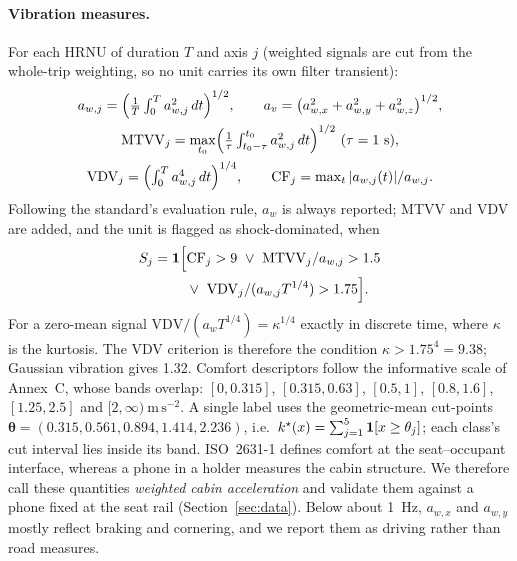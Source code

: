 \paragraph{Vibration measures.}
For each HRNU of duration $T$ and axis $j$ (weighted signals are cut from the whole-trip weighting, so no unit carries its own filter transient):
\begin{gather}
a_{w,j}=\Bigl(\tfrac1T\textstyle\int_0^Ta_{w,j}^2\,dt\Bigr)^{1/2},\qquad
a_v=\bigl(a_{w,x}^2+a_{w,y}^2+a_{w,z}^2\bigr)^{1/2},\\
\mathrm{MTVV}_j=\max_{t_0}\Bigl(\tfrac1\tau\textstyle\int_{t_0-\tau}^{t_0}a_{w,j}^2\,dt\Bigr)^{1/2}\ (\tau=1~\mathrm{s}),\\
\mathrm{VDV}_j=\Bigl(\textstyle\int_0^Ta_{w,j}^4\,dt\Bigr)^{1/4},\qquad
\mathrm{CF}_j=\max_t|a_{w,j}(t)|/a_{w,j}.
\end{gather}
Following the standard's evaluation rule, $a_w$ is always reported; MTVV and VDV are added, and the unit is flagged as shock-dominated, when
\begin{equation}
\begin{aligned}
S_j=\ind\Bigl[&\mathrm{CF}_j>9\ \lor\ \mathrm{MTVV}_j/a_{w,j}>1.5\\
&\lor\ \mathrm{VDV}_j/(a_{w,j}T^{1/4})>1.75\Bigr].
\end{aligned}
\end{equation}
For a zero-mean signal $\mathrm{VDV}/(a_wT^{1/4})=\kappa^{1/4}$ exactly in discrete time, where $\kappa$ is the kurtosis.
The VDV criterion is therefore the condition $\kappa>1.75^4=9.38$; Gaussian vibration gives 1.32.
Comfort descriptors follow the informative scale of Annex~C, whose bands overlap: $[0,0.315]$, $[0.315,0.63]$, $[0.5,1]$, $[0.8,1.6]$, $[1.25,2.5]$ and $[2,\infty)~\mathrm{m\,s^{-2}}$.
A single label uses the geometric-mean cut-points $\boldsymbol\theta=(0.315,0.561,0.894,1.414,2.236)$, i.e.\ $k^\star(x)=\sum_{j=1}^5\mathbf{1}[x\ge\theta_j]$; each class's cut interval lies inside its band.
ISO~2631-1 defines comfort at the seat--occupant interface, whereas a phone in a holder measures the cabin structure.
We therefore call these quantities \emph{weighted cabin acceleration} and validate them against a phone fixed at the seat rail (Section~\ref{sec:data}).
Below about 1~Hz, $a_{w,x}$ and $a_{w,y}$ mostly reflect braking and cornering, and we report them as driving rather than road measures.

